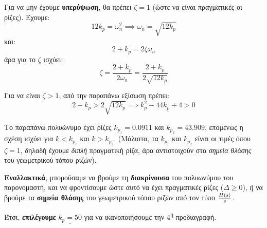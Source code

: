 \documentclass[11pt,a4paper,notitlepage,fleqn]{article}
\begin{document}
\begin{exercise}
\begin{itemize}
	Για να μην έχουμε \textbf{υπερύψωση}, θα πρέπει \( ζ = 1 \) (ώστε να είναι πραγματικές
	οι ρίζες). Έχουμε:
	\[
		12k_p = \omega_n^2
		\implies \omega_n = \sqrt{12 k_p}
	\]
	και:
	\[
	2+k_p = 2ζ\omega_n
	\]
	άρα για το \( ζ \) ισχύει:
	\[
	ζ = \frac{2+k_p}{2\omega_n} = \frac{2+k_p}{2\sqrt{12k_p}}
	\]
	
	Για να είναι \( ζ>1 \), από την παραπάνω εξίσωση πρέπει:
	\[
	2+k_p > 2\sqrt{12k_p} \implies \underline{k_p^2-44k_p+4 > 0}
	\]
	
	Το παραπάνω πολυώνυμο έχει ρίζες \( k_{p_1} = 0.0911 \) και \( k_{p_2} = 43.909 \),
	επομένως η σχέση ισχύει για \( k < k_{p_1} \) και \( k > k_{p_2} \). (Μάλιστα, τα
	\( k_{p_1} \) και \( k_{p_2} \) είναι οι τιμές όπου \( ζ=1 \), δηλαδή έχουμε \textit{διπλή} πραγματική ρίζα, άρα αντιστοιχούν στα \textit{σημεία θλάσης} του
	γεωμετρικού τόπου ριζών).
	
	\textbf{Εναλλακτικά}, μπορούσαμε να βρούμε τη \textbf{διακρίνουσα} του πολυωνύμου
	του παρονομαστή, και να φροντίσουμε ώστε αυτό να έχει πραγματικές ρίζες (\( Δ\geq0 \)),
	\textit{ή} να βρούμε τα \textbf{σημεία θλάσης} του γεωμετρικού τόπου ριζών από τον
	τύπο \( \frac{H(s)}{s} \).
	
	Έτσι, \textbf{επιλέγουμε} \( \underline{k_p = 50} \) για να ικανοποιήσουμε την 4\textsuperscript{η} προδιαγραφή.
\end{itemize}
\end{exercise}
\end{document}
